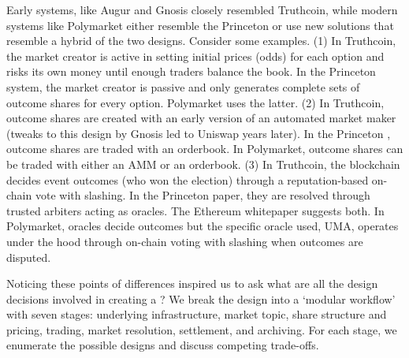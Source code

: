 Early systems, like Augur and Gnosis closely resembled Truthcoin, while modern systems like Polymarket either resemble the Princeton \depm or use new solutions that resemble a hybrid of the two designs. Consider some examples. (1) In Truthcoin, the market creator is active in setting initial prices (\ie odds) for each option and risks its own money until enough traders balance the book. In the Princeton system, the market creator is passive and only generates complete sets of outcome shares for every option. Polymarket uses the latter. (2) In Truthcoin, outcome shares are created with an early version of an automated market maker (tweaks to this design by Gnosis led to Uniswap years later). In the Princeton \depm, outcome shares are traded with an orderbook. In Polymarket, outcome shares can be traded with either an AMM or an orderbook. (3) In Truthcoin, the blockchain decides event outcomes (\eg who won the election) through a reputation-based on-chain vote with slashing. In the Princeton paper, they are resolved through trusted arbiters acting as oracles. The Ethereum whitepaper suggests both. In Polymarket, oracles decide outcomes but the specific oracle used, UMA, operates under the hood through on-chain voting with slashing when outcomes are disputed.

Noticing these points of differences inspired us to ask what are all the design decisions involved in creating a \depm? We break the design into a `modular workflow' with seven stages: underlying infrastructure, market topic, share structure and pricing, trading, market resolution, settlement, and archiving. For each stage, we enumerate the possible designs and discuss competing trade-offs. 

